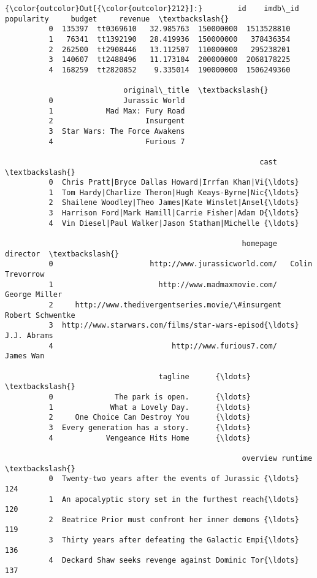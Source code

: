 \documentclass[11pt]{article}
\begin{document}
\begin{Verbatim}[commandchars=\\\{\}]
{\color{outcolor}Out[{\color{outcolor}212}]:}        id    imdb\_id  popularity     budget     revenue  \textbackslash{}
          0  135397  tt0369610   32.985763  150000000  1513528810   
          1   76341  tt1392190   28.419936  150000000   378436354   
          2  262500  tt2908446   13.112507  110000000   295238201   
          3  140607  tt2488496   11.173104  200000000  2068178225   
          4  168259  tt2820852    9.335014  190000000  1506249360   
          
                           original\_title  \textbackslash{}
          0                Jurassic World   
          1            Mad Max: Fury Road   
          2                     Insurgent   
          3  Star Wars: The Force Awakens   
          4                     Furious 7   
          
                                                          cast  \textbackslash{}
          0  Chris Pratt|Bryce Dallas Howard|Irrfan Khan|Vi{\ldots}   
          1  Tom Hardy|Charlize Theron|Hugh Keays-Byrne|Nic{\ldots}   
          2  Shailene Woodley|Theo James|Kate Winslet|Ansel{\ldots}   
          3  Harrison Ford|Mark Hamill|Carrie Fisher|Adam D{\ldots}   
          4  Vin Diesel|Paul Walker|Jason Statham|Michelle {\ldots}   
          
                                                      homepage          director  \textbackslash{}
          0                      http://www.jurassicworld.com/   Colin Trevorrow   
          1                        http://www.madmaxmovie.com/     George Miller   
          2     http://www.thedivergentseries.movie/\#insurgent  Robert Schwentke   
          3  http://www.starwars.com/films/star-wars-episod{\ldots}       J.J. Abrams   
          4                           http://www.furious7.com/         James Wan   
          
                                   tagline      {\ldots}       \textbackslash{}
          0              The park is open.      {\ldots}        
          1             What a Lovely Day.      {\ldots}        
          2     One Choice Can Destroy You      {\ldots}        
          3  Every generation has a story.      {\ldots}        
          4            Vengeance Hits Home      {\ldots}        
          
                                                      overview runtime  \textbackslash{}
          0  Twenty-two years after the events of Jurassic {\ldots}     124   
          1  An apocalyptic story set in the furthest reach{\ldots}     120   
          2  Beatrice Prior must confront her inner demons {\ldots}     119   
          3  Thirty years after defeating the Galactic Empi{\ldots}     136   
          4  Deckard Shaw seeks revenge against Dominic Tor{\ldots}     137   
          

\end{Verbatim}
\end{document}
